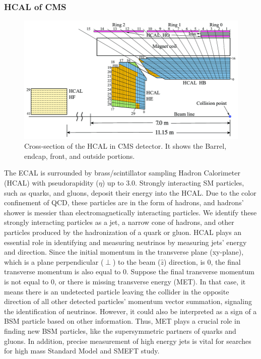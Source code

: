 \subsubsection{HCAL of CMS}
\begin{figure}[h!]
  \caption{Cross-section of the HCAL in CMS detector. It shows the Barrel, endcap, front, and outside portions. \cite{hcal}}
  \label{fig:HCAL}
  \centering
  \includegraphics[width=0.87\linewidth]{figs/HCAL.png}
\end{figure}
The ECAL is surrounded by brass/scintillator sampling Hadron Calorimeter (HCAL) with pseudorapidity ($\eta$) up to 3.0.
Strongly interacting SM particles, such as quarks, and gluons, deposit their energy into the HCAL.
Due to the color confinement of QCD, these particles are in the form of hadrons, and hadrons' shower is messier than electromagnetically interacting particles.
We identify these strongly interacting particles as a jet, a narrow cone of hadrons, and other particles produced by the hadronization of a quark or gluon.
HCAL plays an essential role in identifying and measuring neutrinos by measuring jets' energy and direction.
Since the initial momentum in the transverse plane (xy-plane), which is a plane perpendicular ($\perp$) to the beam ($\hat{z}$) direction, is 0, the final transverse momentum is also equal to 0.
Suppose the final transverse momentum is not equal to 0, or there is missing transverse energy (MET). In that case, it means there is an undetected particle leaving the collider in the opposite direction of all other detected particles' momentum vector summation, signaling the identification of neutrinos.
However, it could also be interpreted as a sign of a BSM particle based on other information.
Thus, MET plays a crucial role in finding new BSM particles, like the supersymmetric partners of quarks and gluons.
In addition, precise measurement of high energy jets is vital for searches for high mass Standard Model and SMEFT study.

